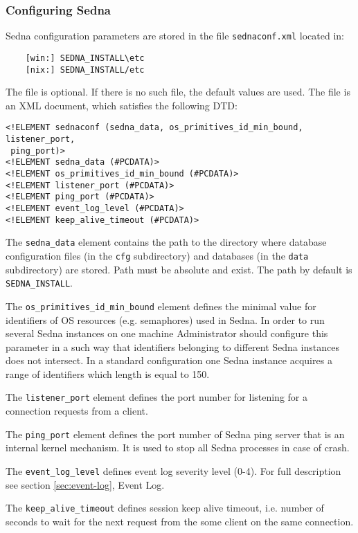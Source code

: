\documentclass[a4paper,12pt]{article}
\begin{document}
\subsubsection{Configuring Sedna}
\label{sec:ConfigSedna}
Sedna configuration parameters are stored in the file \verb!sednaconf.xml! located in:
\begin{verbatim}
	[win:] SEDNA_INSTALL\etc
	[nix:] SEDNA_INSTALL/etc
\end{verbatim}
The file is optional. If there is no such file, the default values are used.
The file is an XML document, which satisfies the following DTD:

\begin{verbatim}
<!ELEMENT sednaconf (sedna_data, os_primitives_id_min_bound, listener_port,
 ping_port)>
<!ELEMENT sedna_data (#PCDATA)>
<!ELEMENT os_primitives_id_min_bound (#PCDATA)>
<!ELEMENT listener_port (#PCDATA)>
<!ELEMENT ping_port (#PCDATA)>
<!ELEMENT event_log_level (#PCDATA)>
<!ELEMENT keep_alive_timeout (#PCDATA)>
\end{verbatim}

The \verb!sedna_data! element contains the path to the directory where
database configuration files (in the \verb!cfg! subdirectory) and
databases (in the \verb!data! subdirectory) are stored. Path must be absolute and exist. The path by default is \verb!SEDNA_INSTALL!.

The \verb!os_primitives_id_min_bound! element defines the minimal value for identifiers of OS resources (e.g. semaphores) used in Sedna. In order to run several Sedna instances on one machine Administrator should configure this parameter in a such way that identifiers belonging to different Sedna instances does not intersect. In a standard configuration one Sedna instance acquires a range of identifiers which length is equal to 150.

The \verb!listener_port! element defines the port number for listening for a connection requests from a client.

The \verb!ping_port! element defines the port number of Sedna ping server that is an internal kernel mechanism. It is used to stop all Sedna processes in case of crash.

The \verb!event_log_level! defines event log severity level (0-4). For full description see section \ref{sec:event-log}, Event Log.

The \verb!keep_alive_timeout! defines session keep alive timeout, i.e. number of seconds to wait for the next request from the some client on the same connection.
\end{document}
